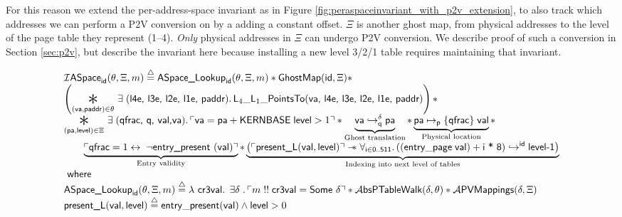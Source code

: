 For this reason we extend the per-address-space invariant as in Figure \ref{fig:peraspaceinvariant_with_p2v_extension}, to also track which
addresses we can perform a P2V conversion on by a adding a constant offset.
$\Xi$ is another ghost map, from physical addresses to the level of the page table they represent (1--4).
\emph{Only} physical addresses in $\Xi$ can undergo P2V conversion. We describe proof of such a conversion in Section \ref{sec:p2v},
but describe the invariant here because installing a new level 3/2/1 table requires maintaining that invariant.

\begin{figure*}
\footnotesize
\[
\begin{array}{l}
  \mathcal{I}\textsf{ASpace}_{\textsf{id}}(\ptablestore,\Xi,m)\stackrel{\triangle}{=} \textsf{ASpace\_Lookup}_{\textsf{id}}(\ptablestore,\Xi,m) \ast \mathsf{GhostMap}(\mathsf{id},\Xi)\ast\\
  \left(\bigast{(\vaddr, \textsf{paddr})\in \ptablestore}{\exists\;(\textsf{l4e, l3e, l2e, l1e, paddr})\ldotp \textsf{L}_{4}\_\textsf{L}_{1}\_\textsf{PointsTo}(\vaddr\textsf{, l4e, l3e, l2e, l1e, paddr})}\right)\ast \\
  \bigast{(\paddr,\mathsf{level}) \in \Xi}{\exists\; (\textsf{qfrac, q, val,}\vaddr) \ldotp \ulcorner \vaddr = \paddr + \textsf{KERNBASE} \; \textsf{level} > 1\urcorner \ast  \underbrace{\fracghostmaptoken{\delta}{\vaddr}{\paddr}{\qfrac} }_\text{Ghost translation} \ast \underbrace{\paddr \mapsto_{\mathsf{p}}\{\textsf{qfrac}\}\; \vale}_\text{Physical location}} \ast\\
   \qquad\underbrace{ \ulcorner \textsf{qfrac} = 1 \leftrightarrow \; \lnot\textsf{entry\_present }(\vale) \urcorner}_\text{Entry validity}\ast 
    \underbrace{\left(\ulcorner\textsf{present\_L}(\vale,\mathsf{level})\urcorner \wand \forall_{\textsf{i}\in\textsf{0..511}} \ldotp \ghostmaptoken{\textsf{id}}{((\mathsf{entry\_page}\;\vale) + \textsf{i * 8})}{\textsf{level-1}}\right)}_{\text{Indexing into next level of tables}} \\
  \textsf{ where } \\
   \textsf{ASpace\_Lookup}_{\textsf{id}}(\ptablestore,\Xi,m) \stackrel{\triangle}{=} \lambda\textsf{ cr3val} \ldotp \; \exists \gammaPred \; \ldotp \ulcorner m \; !!\; \textsf{cr3val} = \textsf{Some } \gammaPred \urcorner \ast
   \ptableabswalk{\delta,\ptablestore} \ast \pvmapping{\delta,\Xi}\\
  \textsf{present\_L}(\vale,\mathsf{level})\stackrel{\triangle}{=} \mathsf{entry\_present}(\vale)\land \mathsf{level} > 0
  
\end{array}
\]
\vspace{-1em}
\caption{Global Address-Space Invariant in Figure \ref{fig:peraspaceinvariant} extended with a ghost map bookkeeping identity mappings }
  \label{fig:peraspaceinvariant_with_p2v_extension}
\end{figure*}

